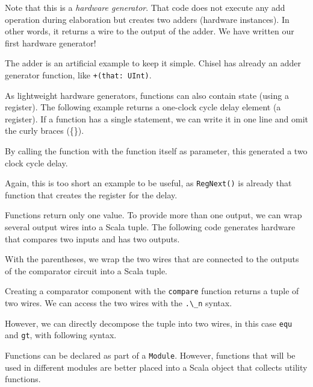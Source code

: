 \documentclass[%
    10pt,
    headinclude, footexclude,
    openright, %
    notitlepage,
    cleardoubleempty,
    headsepline,
    pointlessnumbers,
    bibtotoc, idxtotoc,
    ]{scrbook}
\newcommand{\code}[1]{{\lstinline[basicstyle=\small\ttfamily]{#1}}}
\begin{document}

\noindent Note that this is a \emph{hardware generator}. That code does not execute any add operation
during elaboration but creates two adders (hardware instances). In other words, it returns
a wire to the output of the adder.
We have written our first hardware generator!

The adder is an artificial example
to keep it simple. Chisel has already an adder generator function, like \code{+(that: UInt)}.

As lightweight hardware generators, functions can also contain state (using a register).
The following example returns a one-clock cycle delay element (a register).
If a function has a single statement, we can write it in one line and omit the curly
braces (\{\}).


\noindent By calling the function with the function itself as parameter, this generated a two
clock cycle delay.


\noindent Again, this is too short an example to be useful, as \code{RegNext()}
is already that function that creates the register for the delay.



Functions return only one value. To provide more than one output, we
can wrap several output wires into a Scala tuple. The following code generates hardware that
compares two inputs and has two outputs.


\noindent With the parentheses, we wrap the two wires that are connected to the outputs of
the comparator circuit into a Scala tuple.

Creating a comparator component
with the \code{compare} function returns a tuple of two wires. We can access the two
wires with the \code{.\_n} syntax.


\noindent However, we can directly decompose the tuple into two wires, in this case \code{equ}
and \code{gt}, with following syntax.



Functions can be declared as part of a \code{Module}. However, functions that will be
used in different modules are better placed into a Scala object that collects utility
functions.
\end{document}
